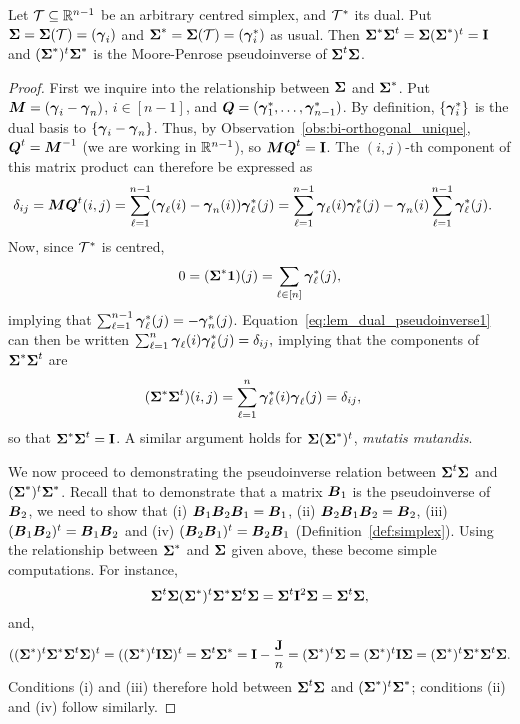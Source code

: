 \begin{lemma}
	\label{lem:dual_pseudoinverse}
	Let $\mathcal{T}\subseteq\mathbb{R}^{n-1}$ be an arbitrary centred  simplex, and $\mathcal{T}^*$ its dual. Put $\boldsymbol{\Sigma}=\boldsymbol{\Sigma}(\mathcal{T})=(\vb*{\gamma}_i)$ and $\boldsymbol{\Sigma}^*=\boldsymbol{\Sigma}(\mathcal{T})=(\vb*{\gamma}_i^*)$ as usual. Then $\boldsymbol{\Sigma}^*\boldsymbol{\Sigma}^t = \boldsymbol{\Sigma}(\boldsymbol{\Sigma}^*)^t=\vb{I}$ and $(\boldsymbol{\Sigma}^*)^t\boldsymbol{\Sigma}^*$ is the Moore-Penrose pseudoinverse of $\boldsymbol{\Sigma}^t\boldsymbol{\Sigma}$. 
\end{lemma}
\begin{proof}
	First we inquire into the relationship between $\boldsymbol{\Sigma}$ and $\boldsymbol{\Sigma}^*$. Put ${\vb*{M}}=(\vb*{\gamma}_i-\vb*{\gamma}_n)$, $i\in[n-1]$, and $\vb*{Q} = (\vb*{\gamma}^*_1,\dots,\vb*{\gamma}_{n-1}^*)$. By definition, $\{\vb*{\gamma}_i^*\}$ is the dual  basis to $\{\vb*{\gamma}_i-\vb*{\gamma}_n\}$. Thus, by Observation~\ref{obs:bi-orthogonal_unique}, $\vb*{Q}^t={\vb*{M}}^{-1}$ (we are working in $\mathbb{R}^{n-1}$), so  ${\vb*{M}}\vb*{Q}^t=\vb{I}$. The $(i,j)$-th component of this matrix product can therefore be expressed as 
	\begin{align}
	\delta_{ij} = {\vb*{M}}\vb*{Q}^t(i,j) &= \sum_{\ell=1}^{n-1} (\vb*{\gamma}_\ell(i) - \vb*{\gamma}_n(i))\vb*{\gamma}_\ell^*(j) = \sum_{\ell=1}^{n-1} \vb*{\gamma}_\ell(i)\vb*{\gamma}^*_\ell(j) - \vb*{\gamma}_n(i)\sum_{\ell=1}^{n-1}\vb*{\gamma}^*_\ell(j).\label{eq:lem_dual_pseudoinverse1}
	\end{align}
	Now,  since $\mathcal{T}^*$ is centred, 
	\begin{equation*}
	0=	(\boldsymbol{\Sigma}^*\vb{1})(j) = \sum_{\ell\in[n]} \vb*{\gamma}_\ell^*(j),
	\end{equation*}
	implying that $\sum_{\ell=1}^{n-1}\vb*{\gamma}_\ell^*(j) = - \vb*{\gamma}_n^*(j)$. Equation~\eqref{eq:lem_dual_pseudoinverse1} can then be written 
	$
	\sum_{\ell=1}^{n} \vb*{\gamma}_\ell(i)\vb*{\gamma}_\ell^*(j)=\delta_{ij},
	$
	implying that the components of $\boldsymbol{\Sigma}^*\boldsymbol{\Sigma}^t$ are
	\begin{align*}
	(\boldsymbol{\Sigma}^*\boldsymbol{\Sigma}^t)(i,j) &= \sum_{\ell=1}^n \vb*{\gamma}_\ell^*(i)\vb*{\gamma}_\ell(j)=\delta_{ij},
	\end{align*}
	so that $\boldsymbol{\Sigma}^*\boldsymbol{\Sigma}^t=\vb{I}$. A similar argument  holds for $\boldsymbol{\Sigma}(\boldsymbol{\Sigma}^*)^t$, \emph{mutatis mutandis}.  
	
	We now proceed to demonstrating the pseudoinverse relation between $\boldsymbol{\Sigma}^t\boldsymbol{\Sigma}$ and $(\boldsymbol{\Sigma}^*)^t\boldsymbol{\Sigma}^*$. Recall that to demonstrate that  a matrix $\vb*{B}_1$ is the pseudoinverse of $\vb*{B}_2$, we need  to show that (i) $\vb*{B}_1\vb*{B}_2\vb*{B}_1=\vb*{B}_1$, (ii) $\vb*{B}_2\vb*{B}_1\vb*{B}_2=\vb*{B}_2$, (iii) $(\vb*{B}_1\vb*{B}_2)^t = \vb*{B}_1\vb*{B}_2$ and  (iv)  $(\vb*{B}_2\vb*{B}_1)^t = \vb*{B}_2\vb*{B}_1$ (Definition~\ref{def:simplex}). Using the relationship between  $\boldsymbol{\Sigma}^*$ and  $\boldsymbol{\Sigma}$ given above, these become simple computations. For instance, 
	\begin{equation*}
	\boldsymbol{\Sigma}^t\boldsymbol{\Sigma}(\boldsymbol{\Sigma}^*)^t\boldsymbol{\Sigma}^*\boldsymbol{\Sigma}^t\boldsymbol{\Sigma} = \boldsymbol{\Sigma}^t \vb{I}^2 \boldsymbol{\Sigma}=\boldsymbol{\Sigma}^t\boldsymbol{\Sigma},
	\end{equation*}
	and, 
	\begin{align*}
	((\boldsymbol{\Sigma}^*)^t\boldsymbol{\Sigma}^* \boldsymbol{\Sigma}^t\boldsymbol{\Sigma})^t = ((\boldsymbol{\Sigma}^*)^t\vb{I}\boldsymbol{\Sigma})^t = \boldsymbol{\Sigma}^t\boldsymbol{\Sigma}^* = \vb{I}-\frac{\vb{J}}{n} = (\boldsymbol{\Sigma}^*)^t\boldsymbol{\Sigma} = (\boldsymbol{\Sigma}^*)^t\vb{I}\boldsymbol{\Sigma} = (\boldsymbol{\Sigma}^*)^t\boldsymbol{\Sigma}^*\boldsymbol{\Sigma}^t\boldsymbol{\Sigma}.
	\end{align*} 
	Conditions (i) and (iii) therefore  hold between $\boldsymbol{\Sigma}^t\boldsymbol{\Sigma}$ and  $(\boldsymbol{\Sigma}^*)^t\boldsymbol{\Sigma}^*$; conditions (ii) and (iv) follow similarly. 
\end{proof}


